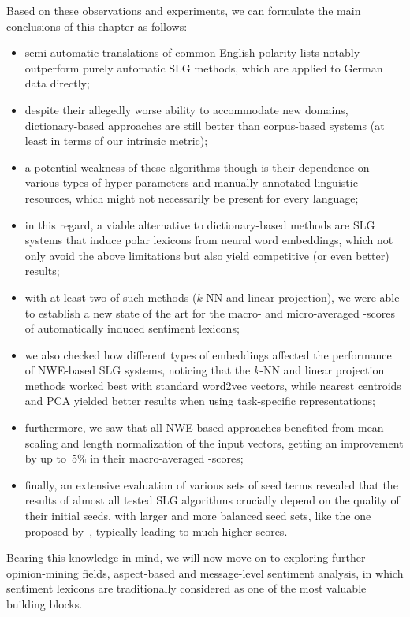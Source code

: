 Based on these observations and experiments, we can formulate the main
conclusions of this chapter as follows:
\begin{itemize}
\item semi-automatic translations of common English polarity lists
  notably outperform purely automatic SLG methods, which are applied
  to German data directly;
\item despite their allegedly worse ability to accommodate new
  domains, dictionary-based approaches are still better than
  corpus-based systems (at least in terms of our intrinsic metric);
\item a potential weakness of these algorithms though is their
  dependence on various types of hyper-parameters and manually
  annotated linguistic resources, which might not necessarily be
  present for every language;
\item in this regard, a viable alternative to dictionary-based methods
  are SLG systems that induce polar lexicons from neural word
  embeddings, which not only avoid the above limitations but also
  yield competitive (or even better) results;
\item with at least two of such methods ($k$-NN and linear
  projection), we were able to establish a new state of the art for
  the macro- and micro-averaged \F-scores of automatically induced
  sentiment lexicons;
\item we also checked how different types of embeddings affected the
  performance of NWE-based SLG systems, noticing that the $k$-NN and
  linear projection methods worked best with standard word2vec
  vectors, while nearest centroids and PCA yielded better results when
  using task-specific representations;
\item furthermore, we saw that all NWE-based approaches benefited from
  mean-scaling and length normalization of the input vectors, getting
  an improvement by up to~5\% in their macro-averaged \F-scores;
\item finally, an extensive evaluation of various sets of seed terms
  revealed that the results of almost all tested SLG algorithms
  crucially depend on the quality of their initial seeds, with larger
  and more balanced seed sets, \eg{} like the one proposed
  by~\citet{Kim:04}, typically leading to much higher scores.
\end{itemize}

Bearing this knowledge in mind, we will now move on to exploring
further opinion-mining fields, aspect-based and message-level
sentiment analysis, in which sentiment lexicons are traditionally
considered as one of the most valuable building blocks.
